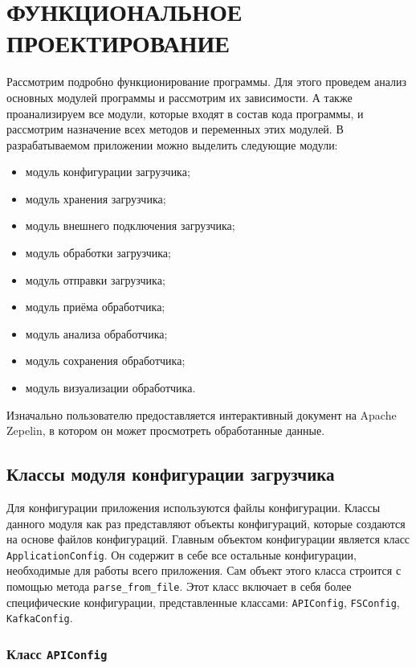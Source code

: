 \section{ФУНКЦИОНАЛЬНОЕ ПРОЕКТИРОВАНИЕ}
\label{sec:func}

Рассмотрим подробно функционирование программы.
Для этого проведем анализ основных модулей программы и рассмотрим их зависимости.
А также проанализируем все модули, которые входят в состав кода программы, и рассмотрим назначение всех методов и переменных этих модулей.
В разрабатываемом приложении можно выделить следующие модули:
\begin{itemize}
    \item модуль конфигурации загрузчика;
    \item модуль хранения загрузчика;
    \item модуль внешнего подключения загрузчика;
    \item модуль обработки загрузчика;
    \item модуль отправки загрузчика;
    \item модуль приёма обработчика;
    \item модуль анализа обработчика;
    \item модуль сохранения обработчика;
    \item модуль визуализации обработчика.
\end{itemize}

Изначально пользователю предоставляется интерактивный документ на Apache Zepelin, в котором он может просмотреть обработанные данные.

\subsection{Классы модуля конфигурации загрузчика}
Для конфигурации приложения используются файлы конфигурации.
Классы данного модуля как раз представляют объекты конфигураций, которые создаются на основе файлов конфигураций.
Главным объектом конфигурации является класс \texttt{ApplicationConfig}.
Он содержит в себе все остальные конфигурации, необходимые для работы всего приложения.
Сам объект этого класса строится с помощью метода \texttt{parse\_from\_file}.
Этот класс включает в себя более специфические конфигурации, представленные классами: \texttt{APIConfig}, \texttt{FSConfig}, \texttt{KafkaConfig}.

\subsubsection{Класс \texttt{APIConfig}}

